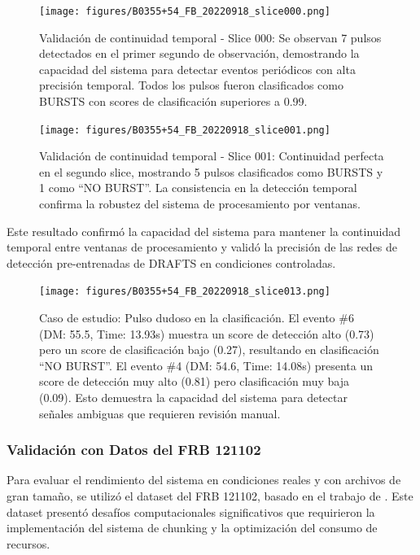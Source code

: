 \begin{figure}[H]
    \centering
    \texttt{[image: figures/B0355+54\_FB\_20220918\_slice000.png]}
    \caption[Validación continuidad temporal: Slice 000]{Validación de continuidad temporal - Slice 000: Se observan 7 pulsos detectados en el primer segundo de observación, demostrando la capacidad del sistema para detectar eventos periódicos con alta precisión temporal. Todos los pulsos fueron clasificados como BURSTS con scores de clasificación superiores a 0.99.}
    \label{fig:b0355_slice000}
\end{figure}


\begin{figure}[H]
    \centering
    \texttt{[image: figures/B0355+54\_FB\_20220918\_slice001.png]}
    \caption[Validación continuidad temporal: Slice 001]{Validación de continuidad temporal - Slice 001: Continuidad perfecta en el segundo slice, mostrando 5 pulsos clasificados como BURSTS y 1 como ``NO BURST''. La consistencia en la detección temporal confirma la robustez del sistema de procesamiento por ventanas.}
    \label{fig:b0355_slice001}
\end{figure}

Este resultado confirmó la capacidad del sistema para mantener la continuidad temporal entre ventanas de procesamiento y validó la precisión de las redes de detección pre-entrenadas de DRAFTS en condiciones controladas.

\begin{figure}[H]
    \centering
    \texttt{[image: figures/B0355+54\_FB\_20220918\_slice013.png]}
    \caption[Pulso dudoso en la clasificación]{Caso de estudio: Pulso dudoso en la clasificación. El evento \#6 (DM: 55.5, Time: 13.93s) muestra un score de detección alto (0.73) pero un score de clasificación bajo (0.27), resultando en clasificación ``NO BURST''. El evento \#4 (DM: 54.6, Time: 14.08s) presenta un score de detección muy alto (0.81) pero clasificación muy baja (0.09). Esto demuestra la capacidad del sistema para detectar señales ambiguas que requieren revisión manual.}
    \label{fig:b0355_slice013}
\end{figure}

\subsubsection{Validación con Datos del FRB 121102}

Para evaluar el rendimiento del sistema en condiciones reales y con archivos de gran tamaño, se utilizó el dataset del FRB 121102, basado en el trabajo de \cite{cruces2020frb121102}. Este dataset presentó desafíos computacionales significativos que requirieron la implementación del sistema de chunking y la optimización del consumo de recursos.

